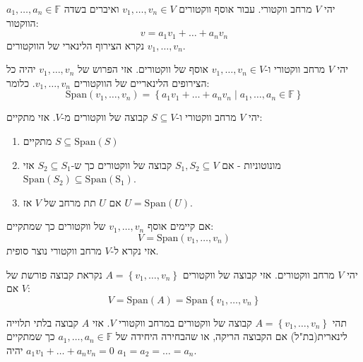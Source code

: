 \documentclass{tstextbook}
\begin{document}
\begin{definition}
יהי \(V\) מרחב ווקטורי. עבור אוסף ווקטורים \(v_{1},\dots,v_{n}\in V\) ואיברים בשדה \(a_{1},\dots,a_{n}\in \mathbb{F}\) הווקטור:
$$v=a_{1}v_{1}+\dots+a_{n}v_{n}$$
נקרא הצירוף הלינארי של הווקטורים \(v_{1},\dots,v_{n}\).

\end{definition}
\begin{definition}[פרוש]
יהי \(V\) מרחב ווקטורי ו-\(v_{1},\dots,v_{n}\in V\) אוסף של ווקטורים. אזי הפרוש של \(v_{1},\dots,v_{n}\) יהיה כל הצירופים הלינאריים של הווקטורים \(v_{1},\dots,v_{n}\). כלומר:
$$\mathrm{Span}\left( v_{1},\dots,v_{n} \right)=\left\{  a_{1}v_{1}+\dots+a_{n}v_{n}\mid a_{1},\dots,a_{n}\in \mathbb{F}   \right\}$$

\end{definition}
\begin{proposition}
יהי \(V\) מרחב ווקטורי ו-\(S\subseteq V\) קבוצה של ווקטורים מ-\(V\). אזי מתקיים:

\end{proposition}
\begin{enumerate}
  \item מתקיים \(S\subseteq \mathrm{Span}(S)\)


  \item מונוטוניות - אם \(S_{1},S_{2}\subseteq V\) קבוצה של ווקטורים כך ש-\(S_{2}\subseteq S_{1}\) אזי \(\mathrm{Span}(S_{2})\subseteq \mathrm{Span(S_{1})}\). 


  \item אם \(U\) תת מרחב של \(V\) אז \(U=\mathrm{Span}(U)\). 


\end{enumerate}
\begin{definition}
אם קיימים אוסף \(v_{1},\dots,v_{n}\) של ווקטורים כך שמתקיים:
$$V=\mathrm{Span}\left( v_{1},\dots,v_{n} \right)$$
אזי נקרא ל-\(V\) מרחב ווקטורי נוצר סופית.

\end{definition}
\begin{definition}
יהי \(V\) מרחב ווקטורים. אזי קבוצה של ווקטורים \(A=\left\{  v_{1},\dots,v_{n}  \right\}\) נקראת קבוצה פורשת של \(V\) אם:
$$V=\mathrm{Span}(A)=\mathrm{Span}\left\{  v_{1},\dots,v_{n}  \right\}$$

\end{definition}
\begin{definition}
תהי \(A=\left\{  v_{1},\dots,v_{n}  \right\}\) קבוצה של ווקטורים במרחב ווקטורי \(V\). אזי \(A\) קבוצה בלתי תלוייה לינארית(בת"ל) אם הקבוצה הריקה, או שהבחירה היחידה של \(a_{1},\dots,a_{n}\in \mathbb{F}\) כך שמתקיים \(a_{1}v_{1}+\dots+a_{n}v_{n}=0\) יהיה \(a_{1}=a_{2}=\dots=a_{n}\).

\end{definition}
\end{document}
